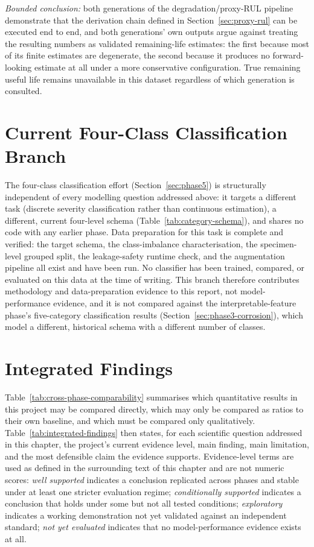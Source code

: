 \emph{Bounded conclusion:} both generations of the degradation/proxy-RUL
pipeline demonstrate that the derivation chain defined in
Section~\ref{sec:proxy-rul} can be executed end to end, and both
generations' own outputs argue against treating the resulting numbers as
validated remaining-life estimates: the first because most of its finite
estimates are degenerate, the second because it produces no forward-looking
estimate at all under a more conservative configuration. True remaining
useful life remains unavailable in this dataset regardless of which
generation is consulted.

\section{Current Four-Class Classification Branch}
\label{sec:results-classification}

The four-class classification effort (Section~\ref{sec:phase5}) is
structurally independent of every modelling question addressed above: it
targets a different task (discrete severity classification rather than
continuous estimation), a different, current four-level schema
(Table~\ref{tab:category-schema}), and shares no code with any earlier
phase. Data preparation for this task is complete and verified: the target
schema, the class-imbalance characterisation, the specimen-level grouped
split, the leakage-safety runtime check, and the augmentation pipeline all
exist and have been run. No classifier has been trained, compared, or
evaluated on this data at the time of writing. This branch therefore
contributes methodology and data-preparation evidence to this report, not
model-performance evidence, and it is not compared against the
interpretable-feature phase's five-category classification results
(Section~\ref{sec:phase3-corrosion}), which model a different, historical
schema with a different number of classes.

\section{Integrated Findings}
\label{sec:results-integrated}

Table~\ref{tab:cross-phase-comparability} summarises which quantitative
results in this project may be compared directly, which may only be
compared as ratios to their own baseline, and which must be compared only
qualitatively. Table~\ref{tab:integrated-findings} then states, for each
scientific question addressed in this chapter, the project's current
evidence level, main finding, main limitation, and the most defensible
claim the evidence supports. Evidence-level terms are used as defined in
the surrounding text of this chapter and are not numeric scores: \emph{well
supported} indicates a conclusion replicated across phases and stable under
at least one stricter evaluation regime; \emph{conditionally supported}
indicates a conclusion that holds under some but not all tested conditions;
\emph{exploratory} indicates a working demonstration not yet validated
against an independent standard; \emph{not yet evaluated} indicates that no
model-performance evidence exists at all.

